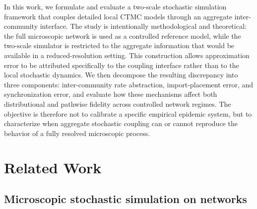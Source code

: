 \documentclass[a4paper,fleqn]{cas-sc}
\begin{document}
In this work, we formulate and evaluate a two-scale stochastic simulation framework that couples detailed local CTMC models through an aggregate inter-community interface. The study is intentionally methodological and theoretical: the full microscopic network is used as a controlled reference model, while the two-scale simulator is restricted to the aggregate information that would be available in a reduced-resolution setting. This construction allows approximation error to be attributed specifically to the coupling interface rather than to the local stochastic dynamics. We then decompose the resulting discrepancy into three components: inter-community rate abstraction, import-placement error, and synchronization error, and evaluate how these mechanisms affect both distributional and pathwise fidelity across controlled network regimes. The objective is therefore not to calibrate a specific empirical epidemic system, but to characterize when aggregate stochastic coupling can or cannot reproduce the behavior of a fully resolved microscopic process.

\section{Related Work}
\label{sec:related_work}

\subsection{Microscopic stochastic simulation on networks}

\end{document}
